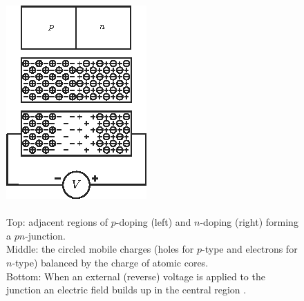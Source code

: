 \begin{figure}[!h]
    \begin{minipage}[c]{.25\linewidth}
        \includegraphics[width=1\linewidth]{Images/LGADs/p-n junction with voltage.png}
    \end{minipage}
    \hfill
    \begin{minipage}[c]{.6\linewidth}
        \caption{\\Top: adjacent regions of $p$-doping (left) and $n$-doping (right) forming a $pn$-junction.\\
        Middle: the circled mobile charges (holes for $p$-type and electrons for $n$-type) balanced by the charge of atomic cores.\\
        Bottom: When an external (reverse) voltage is applied to the junction an electric field builds up in the central region \cite{10.1093/acprof:oso/9780198527848.003.0001}.}
    \end{minipage}
    \label{fig:p-n_junction_reverse_bias_voltage}
\end{figure} 

